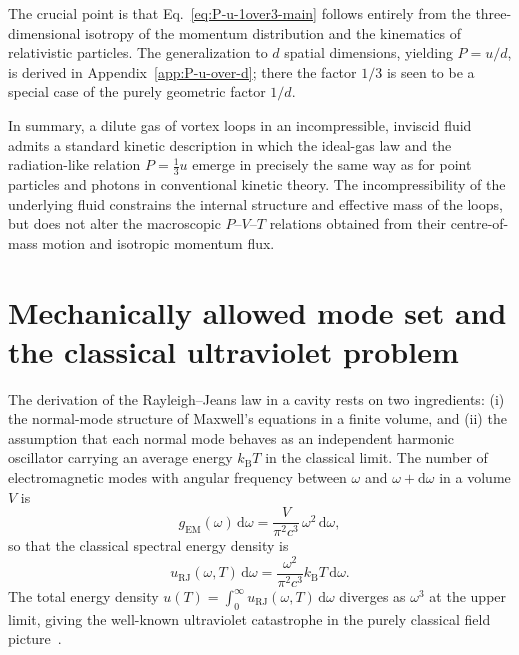 \documentclass[11pt]{article}
\begin{document}
        The crucial point is that Eq.~\eqref{eq:P-u-1over3-main} follows entirely from the
        three-dimensional isotropy of the momentum distribution and the kinematics of
        relativistic particles. The generalization to $d$ spatial dimensions, yielding
        $P = u/d$, is derived in Appendix~\ref{app:P-u-over-d}; there the factor $1/3$ is seen
        to be a special case of the purely geometric factor $1/d$.

            \medskip

            In summary, a dilute gas of vortex loops in an incompressible, inviscid fluid admits
            a standard kinetic description in which the ideal-gas law and the radiation-like
            relation $P = \tfrac{1}{3}u$ emerge in precisely the same way as for point particles
            and photons in conventional kinetic theory. The incompressibility of the underlying
            fluid constrains the internal structure and effective mass of the loops, but does not
            alter the macroscopic $P$--$V$--$T$ relations obtained from their centre-of-mass motion
            and isotropic momentum flux.


    \section{Mechanically allowed mode set and the classical ultraviolet problem}
        \label{sec:modes-UV}

        The derivation of the Rayleigh--Jeans law in a cavity rests on two ingredients:
        (i) the normal-mode structure of Maxwell's equations in a finite volume, and
        (ii) the assumption that each normal mode behaves as an independent harmonic oscillator
        carrying an average energy $k_{\mathrm B}T$ in the classical limit.
        The number of electromagnetic modes with angular frequency between $\omega$ and
        $\omega+\mathrm{d}\omega$ in a volume $V$ is~\cite{LandauLifshitz_Fields}
        \begin{equation}
            g_{\mathrm{EM}}(\omega)\,\mathrm{d}\omega
            = \frac{V}{\pi^2 c^3}\,\omega^2\,\mathrm{d}\omega,
            \label{eq:g-EM}
        \end{equation}
        so that the classical spectral energy density is
        \begin{equation}
            u_{\mathrm{RJ}}(\omega,T)\,\mathrm{d}\omega
            = \frac{\omega^2}{\pi^2 c^3} k_{\mathrm B}T\,\mathrm{d}\omega.
            \label{eq:u-RJ}
        \end{equation}
        The total energy density $u(T) = \int_0^\infty u_{\mathrm{RJ}}(\omega,T)\,\mathrm{d}\omega$
        diverges as $\omega^3$ at the upper limit, giving the well-known ultraviolet catastrophe
        in the purely classical field picture~\cite{Rayleigh1900,Jeans1905,Planck1901}.
\end{document}
